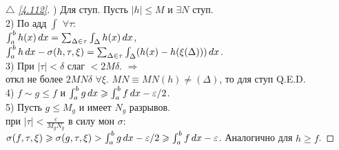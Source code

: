 \begin{minipage}[t]{0.45\textwidth}
\begin{proof}[
 $\triangle$
\eqref{4.112}]

\phantom{42}

) Для ступ. Пусть $|h| \leq M$ и $\exists N$ ступ. \\
2) По адд $\int$ $\forall \tau$: \\
$\int_a^b h(x) \, d x = \sum_{\Delta \in \tau} \int_{\Delta} h(x) \, d x$, \\
$\int_a^b h \, d x - \sigma(h, \tau, \xi) = \sum_{\Delta \in \tau} \int_{\Delta} (h(x) - h(\xi(\Delta))) \, d x$. \\
3) При $|\tau| < \delta$ слаг $< 2 M \delta$. $\Rightarrow$ \\
откл не более $2 M N \delta$ $\forall \xi$. 
$MN \equiv MN(h) \neq (\Delta)$, то для ступ Q.E.D. \\
4) $f \sim g \leq f$ и $\int_a^b g \, d x \geqslant \int_a^b f \, d x - \varepsilon/2$. \\
5) Пусть $g \leq M_g$ и имеет $N_g$ разрывов. \\
при $|\tau| < \frac{\varepsilon}{M_g N_g}$ в силу мон $\sigma$:\\
$\sigma(f, \tau, \xi) \geqslant \sigma(g, \tau, \xi) > \int_a^b g \, d x - \varepsilon/2 \geqslant \int_a^b f \, d x - \varepsilon$. 
Аналогично для $h \geq f$.
\end{proof}
\end{minipage}

\phantom{42}

